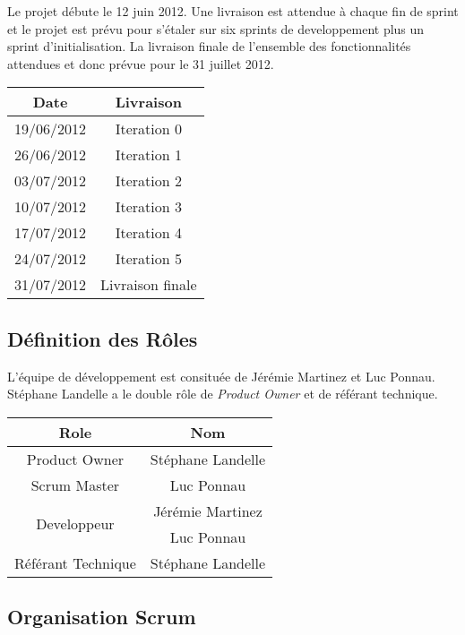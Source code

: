 \documentclass[11pt]{article}
\begin{document}
Le projet débute le 12 juin 2012. Une livraison est attendue à chaque fin de
sprint et le projet est prévu pour s'étaler sur six sprints de developpement
plus un sprint d'initialisation. La livraison finale de l'ensemble des
fonctionnalités attendues et donc prévue pour le 31 juillet 2012.

\begin{center}
\begin{tabular}{ | c | c | }
\hline \textbf{Date} & \textbf{Livraison} \\
\hline 19/06/2012 & Iteration 0 \\
\hline 26/06/2012 & Iteration 1 \\
\hline 03/07/2012 & Iteration 2 \\
\hline 10/07/2012 & Iteration 3 \\
\hline 17/07/2012 & Iteration 4 \\
\hline 24/07/2012 & Iteration 5 \\
\hline 31/07/2012 & Livraison finale \\ \hline
\end{tabular}
\end{center}

\subsection{Définition des Rôles}

L'équipe de développement est consituée de Jérémie Martinez et Luc Ponnau.
Stéphane Landelle a le double rôle de \emph{Product Owner} et de référant 
technique.

\begin{center}
\begin{tabular}{ | c | c | }
\hline \textbf{Role} & \textbf{Nom} \\
\hline Product Owner & Stéphane Landelle \\
\hline Scrum Master & Luc Ponnau \\
\hline \multirow{2}{*}{Developpeur} & Jérémie Martinez \\ & Luc Ponnau \\
\hline Référant Technique & Stéphane Landelle \\ \hline
\end{tabular}
\end{center}

\subsection{Organisation Scrum}
\end{document}
